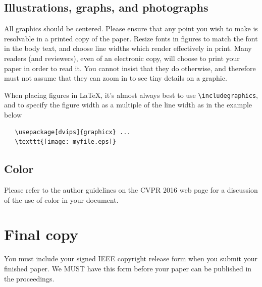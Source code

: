 \documentclass[10pt,twocolumn,letterpaper]{article}
\begin{document}
\subsection{Illustrations, graphs, and photographs}

All graphics should be centered.  Please ensure that any point you wish to
make is resolvable in a printed copy of the paper.  Resize fonts in figures
to match the font in the body text, and choose line widths which render
effectively in print.  Many readers (and reviewers), even of an electronic
copy, will choose to print your paper in order to read it.  You cannot
insist that they do otherwise, and therefore must not assume that they can
zoom in to see tiny details on a graphic.

When placing figures in \LaTeX, it's almost always best to use
\verb+\includegraphics+, and to specify the  figure width as a multiple of
the line width as in the example below
{\small\begin{verbatim}
   \usepackage[dvips]{graphicx} ...
   \texttt{[image: myfile.eps]}
\end{verbatim}
}


\subsection{Color}

Please refer to the author guidelines on the CVPR 2016 web page for a discussion
of the use of color in your document.

\section{Final copy}

You must include your signed IEEE copyright release form when you submit
your finished paper. We MUST have this form before your paper can be
published in the proceedings.


{\small


}
\end{document}
